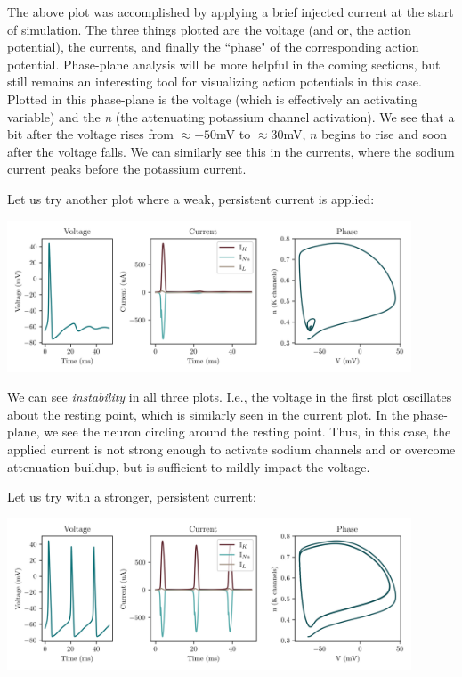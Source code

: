 The above plot was accomplished by applying a brief injected current at the start of simulation. The three things plotted are the voltage (and or, the action potential), the currents, and finally the ``phase" of the corresponding action potential. Phase-plane analysis will be more helpful in the coming sections, but still remains an interesting tool for visualizing action potentials in this case. Plotted in this phase-plane is the voltage (which is effectively an activating variable) and the \textit{n} (the attenuating potassium channel activation). We see that a bit after the voltage rises from $\approx -50$mV to $\approx 30$mV, $n$ begins to rise and soon after the voltage falls. We can similarly see this in the currents, where the sodium current peaks before the potassium current.\newline

Let us try another plot where a weak, persistent current is applied: 

\begin{center}
\includegraphics[width=0.9\textwidth]{images/models/hh2.png}
\end{center}

We can see \textit{instability} in all three plots. I.e., the voltage in the first plot oscillates about the resting point, which is similarly seen in the current plot. In the phase-plane, we see the neuron circling around the resting point. Thus, in this case, the applied current is not strong enough to activate sodium channels and or overcome attenuation buildup, but is sufficient to mildly impact the voltage. 

Let us try with a stronger, persistent current: 

\begin{center}
\includegraphics[width=0.9\textwidth]{images/models/hh3.png}
\end{center}


